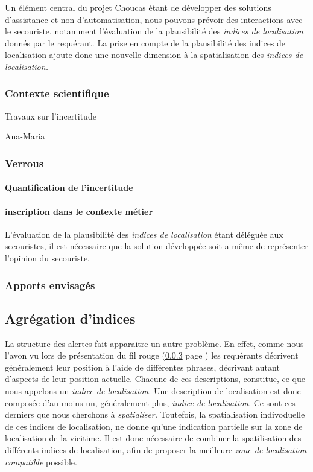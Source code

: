 Un élément central du projet Choucas étant de développer des solutions
d'assistance et non d'automatisation, nous pouvons prévoir des
interactions avec le secouriste, notamment l'évaluation de la
plausibilité des \emph{indices de localisation} donnés par le
requérant. La prise en compte de la plausibilité des indices de
localisation ajoute donc une nouvelle dimension à la spatialisation
des \emph{indices de localisation.}

\subsubsection{Contexte scientifique}

Travaux sur l'incertitude

Ana-Maria

\subsubsection{Verrous}

\paragraph{Quantification de l'incertitude}

\paragraph{inscription dans le contexte métier}

L'évaluation de la plausibilité des \emph{indices de localisation}
étant déléguée aux secouristes, il est nécessaire que la solution
développée soit a même de représenter l'opinion du secouriste.


\subsubsection{Apports envisagés}

\subsection{Agrégation d'indices}
\label{subsec:2-1-4}

La structure des alertes fait apparaitre un autre problème. En effet,
comme nous l'avon vu lors de présentation du fil rouge (\ref{} page
\pageref{})  les
requérants décrivent généralement leur position à l'aide de
différentes phrases, décrivant autant d'aspects de leur position
actuelle. Chacune de ces descriptions, constitue, ce que nous appelons
un \emph{indice de localisation.} Une description de localisation est
donc composée d'au moins un, généralement plus, \emph{indice de
  localisation}. Ce sont ces derniers que nous cherchons à
\emph{spatialiser.} Toutefois, la spatialisation indivoduelle de ces
indices de localisation, ne donne qu'une indication partielle sur la
zone de localisation de la vicitime. Il est donc nécessaire de
combiner la spatilisation des différents indices de localisation, afin
de proposer la meilleure \emph{zone de localisation compatible}
possible.

